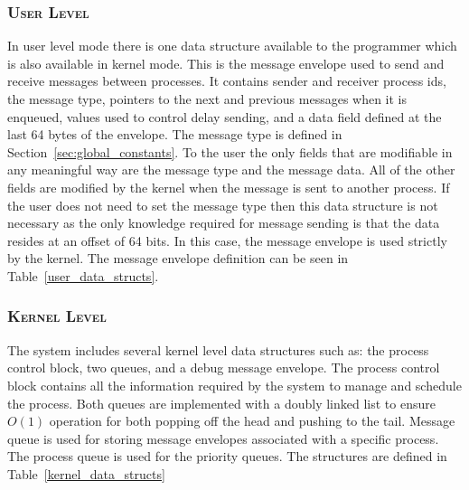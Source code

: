 \documentclass[oneside]{report}
\begin{document}
\subsubsection{\textsc{User Level}}
In user level mode there is one data structure available to the programmer
which is also available in kernel mode. This is the message envelope used to
send and receive messages between processes. It contains sender and receiver
process ids, the message type, pointers to the next and previous messages when
it is enqueued, values used to control delay sending, and a data field defined 
at the last 64 bytes of the envelope. The message type is defined in
Section~\ref{sec:global_constants}. To the user the only fields that are
modifiable in any meaningful way are the message type and the message data. All 
of the other fields are modified by the kernel when the message is sent to 
another process. If the user does not need to set the message type then this 
data structure is not necessary as the only knowledge required for message 
sending is that the data resides at an offset of 64 bits. In this case, the 
message envelope is used strictly by the kernel. The message envelope definition 
can be seen in Table~\ref{user_data_structs}.

\begin{table}[H]
    \caption{User Level Data Structure}
    \label{user_data_structs}
\end{table}

\subsubsection{\textsc{Kernel Level}}
The system includes several kernel level data structures such as: the process
control block, two queues, and a debug message envelope. The process control
block contains all the information required by the system to manage and
schedule the process. Both queues are implemented with a doubly linked list to
ensure $O(1)$ operation for both popping off the head and pushing to the tail.
Message queue is used for storing message envelopes associated with a specific
process. The process queue is used for the priority queues. The structures are
defined in Table~\ref{kernel_data_structs}
\end{document}
